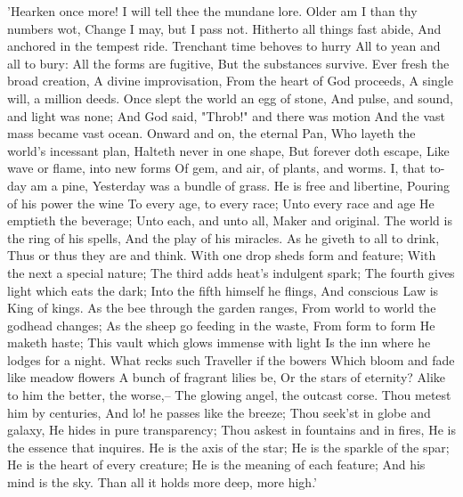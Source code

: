 'Hearken once more!
I will tell thee the mundane lore.
Older am I than thy numbers wot,
Change I may, but I pass not.
Hitherto all things fast abide,
And anchored in the tempest ride.
Trenchant time behoves to hurry
All to yean and all to bury:
All the forms are fugitive,
But the substances survive.
Ever fresh the broad creation,
A divine improvisation,
From the heart of God proceeds,
A single will, a million deeds.
Once slept the world an egg of stone,
And pulse, and sound, and light was none;
And God said, "Throb!" and there was motion
And the vast mass became vast ocean.
Onward and on, the eternal Pan,
Who layeth the world's incessant plan,
Halteth never in one shape,
But forever doth escape,
Like wave or flame, into new forms
Of gem, and air, of plants, and worms.
I, that to-day am a pine,
Yesterday was a bundle of grass.
He is free and libertine,
Pouring of his power the wine
To every age, to every race;
Unto every race and age
He emptieth the beverage;
Unto each, and unto all,
Maker and original.
The world is the ring of his spells,
And the play of his miracles.
As he giveth to all to drink,
Thus or thus they are and think.
With one drop sheds form and feature;
With the next a special nature;
The third adds heat's indulgent spark;
The fourth gives light which eats the dark;
Into the fifth himself he flings,
And conscious Law is King of kings.
As the bee through the garden ranges,
From world to world the godhead changes;
As the sheep go feeding in the waste,
From form to form He maketh haste;
This vault which glows immense with light
Is the inn where he lodges for a night.
What recks such Traveller if the bowers
Which bloom and fade like meadow flowers
A bunch of fragrant lilies be,
Or the stars of eternity?
Alike to him the better, the worse,--
The glowing angel, the outcast corse.
Thou metest him by centuries,
And lo! he passes like the breeze;
Thou seek'st in globe and galaxy,
He hides in pure transparency;
Thou askest in fountains and in fires,
He is the essence that inquires.
He is the axis of the star;
He is the sparkle of the spar;
He is the heart of every creature;
He is the meaning of each feature;
And his mind is the sky.
Than all it holds more deep, more high.'
